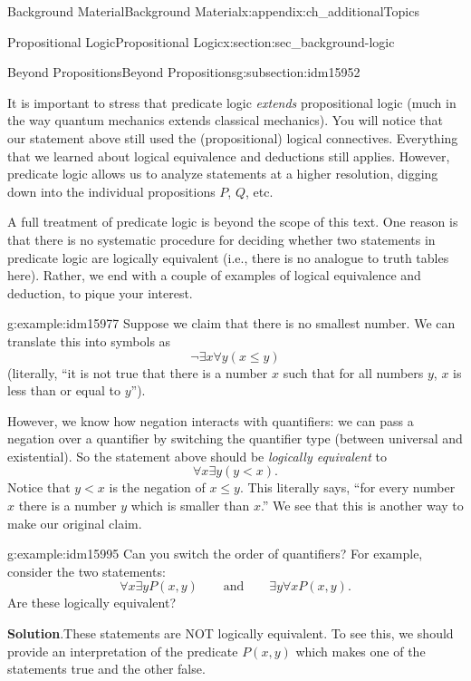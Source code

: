 \documentclass[oneside,10pt,]{book}
\numberwithin{equation}{chapter}
\newcommand{\lt}{<}
\begin{document}
\begin{appendixptx}{Background Material}{}{Background Material}{}{}{x:appendix:ch_additionalTopics}
\begin{sectionptx}{Propositional Logic}{}{Propositional Logic}{}{}{x:section:sec_background-logic}
\begin{subsectionptx}{Beyond Propositions}{}{Beyond Propositions}{}{}{g:subsection:idm15952}
\par
It is important to stress that predicate logic \emph{extends} propositional logic (much in the way quantum mechanics extends classical mechanics).  You will notice that our statement above still used the (propositional) logical connectives.  Everything that we learned about logical equivalence and deductions still applies.  However, predicate logic allows us to analyze statements at a higher resolution, digging down into the individual propositions \(P\), \(Q\), etc.%
\par
A full treatment of predicate logic is beyond the scope of this text.  One reason is that there is no systematic procedure for deciding whether two statements in predicate logic are logically equivalent (i.e., there is no analogue to truth tables here).  Rather, we end with a couple of examples of logical equivalence and deduction, to pique your interest.%
\begin{example}{}{g:example:idm15977}%
Suppose we claim that there is no smallest number.  We can translate this into symbols as%
\begin{equation*}
\neg \exists x \forall y (x \le y)
\end{equation*}
(literally, ``it is not true that there is a number \(x\) such that for all numbers \(y\), \(x\) is less than or equal to \(y\)'').%
\par
However, we know how negation interacts with quantifiers: we can pass a negation over a quantifier by switching the quantifier type (between universal and existential).  So the statement above should be \emph{logically equivalent} to%
\begin{equation*}
\forall x \exists y (y \lt x).
\end{equation*}
Notice that \(y \lt x\) is the negation of \(x \le y\).  This literally says, ``for every number \(x\) there is a number \(y\) which is smaller than \(x\).''  We see that this is another way to make our original claim.%
\end{example}
\begin{example}{}{g:example:idm15995}%
Can you switch the order of quantifiers? For example, consider the two statements:%
\begin{equation*}
\forall x \exists y P(x,y) \qquad \mathrm{ and } \qquad \exists y \forall x P(x,y).
\end{equation*}
Are these logically equivalent?%
\par\smallskip%
\noindent\textbf{Solution}.\hypertarget{g:solution:idm15999}{}\quad{}These statements are NOT logically equivalent. To see this, we should provide an interpretation of the predicate \(P(x,y)\) which makes one of the statements true and the other false.%

\end{example}
\end{subsectionptx}
\end{sectionptx}
\end{appendixptx}
\end{document}
